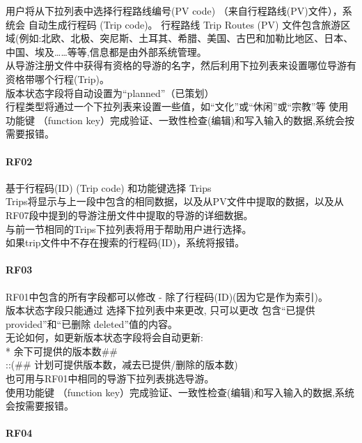 用户将从下拉列表中选择行程路线编号(PV code)
（来自行程路线(PV)文件），系统会 自动生成行程码 (Trip code)。 行程路线
Trip Routes (PV)
文件包含旅游区域(例如:北欧、北极、突尼斯、土耳其、希腊、美国、古巴和加勒比地区、日本、中国、埃及\ldots{}\ldots{}等等,信息都是由外部系统管理。\\
从导游注册文件中获得有资格的导游的名字，然后利用下拉列表来设置哪位导游有资格带哪个行程(Trip)。\\
版本状态字段将自动设置为``planned''（已策划）\\
行程类型将通过一个下拉列表来设置一些值，如``文化''或``休闲''或``宗教''等
使用功能键 （function
key）完成验证、一致性检查(编辑)和写入输入的数据,系统会按需要报错。\\

\hypertarget{rf02}{%
\paragraph{RF02}\label{rf02}}

基于行程码(ID) (Trip code) 和功能键选择 Trips\\
Trips将显示与上一段中包含的相同数据，以及从PV文件中提取的数据，以及从RF07段中提到的导游注册文件中提取的导游的详细数据。\\
与前一节相同的Trips下拉列表将用于帮助用户进行选择。\\
如果trip文件中不存在搜索的行程码(ID)，系统将报错。\\

\hypertarget{rf03}{%
\paragraph{RF03}\label{rf03}}

RF01中包含的所有字段都可以修改 - 除了行程码(ID)(因为它是作为索引)。\\
版本状态字段只能通过 选择下拉列表中来更改, 只可以更改 包含``已提供
provided''和``已删除 deleted''值的内容。\\
无论如何，如更新版本状态字段将会自动更新:\\
* 余下可提供的版本数\#\#\\
::(\#\# 计划可提供版本数，减去已提供/删除的版本数)\\
也可用与RF01中相同的导游下拉列表挑选导游。\\
使用功能键 （function
key）完成验证、一致性检查(编辑)和写入输入的数据,系统会按需要报错。\\

\hypertarget{rf04}{%
\paragraph{RF04}\label{rf04}}

